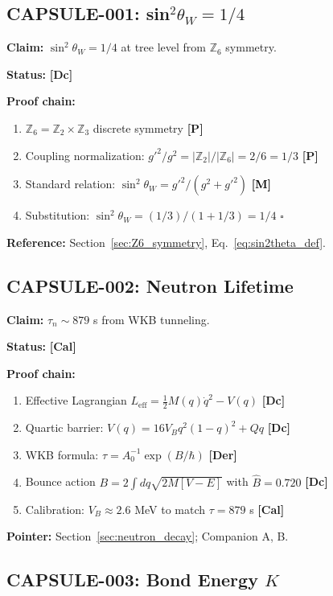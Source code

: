 \documentclass[11pt,a4paper]{article}
\newcommand{\tagP}{\textcolor{red!70!black}{\textbf{[P]}}}
\newcommand{\tagDc}{\textcolor{blue!70!black}{\textbf{[Dc]}}}
\newcommand{\tagDer}{\textcolor{green!50!black}{\textbf{[Der]}}}
\newcommand{\tagCal}{\textcolor{purple!70!black}{\textbf{[Cal]}}}
\newcommand{\tagM}{\textcolor{black}{\textbf{[M]}}}
\begin{document}
\subsection{CAPSULE-001: sin$^2\theta_W = 1/4$}

\textbf{Claim:} $\sin^2\theta_W = 1/4$ at tree level from $\mathbb{Z}_6$ symmetry.

\textbf{Status:} \tagDc{}

\textbf{Proof chain:}
\begin{enumerate}
    \item $\mathbb{Z}_6 = \mathbb{Z}_2 \times \mathbb{Z}_3$ discrete symmetry \tagP{}
    \item Coupling normalization: $g'^2/g^2 = |\mathbb{Z}_2|/|\mathbb{Z}_6| = 2/6 = 1/3$ \tagP{}
    \item Standard relation: $\sin^2\theta_W = g'^2/(g^2+g'^2)$ \tagM{}
    \item Substitution: $\sin^2\theta_W = (1/3)/(1 + 1/3) = 1/4$ \quad $\square$
\end{enumerate}

\textbf{Reference:} Section~\ref{sec:Z6_symmetry}, Eq.~\eqref{eq:sin2theta_def}.

\subsection{CAPSULE-002: Neutron Lifetime}

\textbf{Claim:} $\tau_n \sim 879$ s from WKB tunneling.

\textbf{Status:} \tagCal{}

\textbf{Proof chain:}
\begin{enumerate}
    \item Effective Lagrangian $L_{\text{eff}} = \frac{1}{2}M(q)\dot{q}^2 - V(q)$ \tagDc{}
    \item Quartic barrier: $V(q) = 16V_B q^2(1-q)^2 + Qq$ \tagDc{}
    \item WKB formula: $\tau = A_0^{-1} \exp(B/\hbar)$ \tagDer{}
    \item Bounce action $B = 2\int dq\sqrt{2M[V-E]}$ with $\hat{B} = 0.720$ \tagDc{}
    \item Calibration: $V_B \approx 2.6$ MeV to match $\tau = 879$ s \tagCal{}
\end{enumerate}

\textbf{Pointer:} Section~\ref{sec:neutron_decay}; Companion A, B.

\subsection{CAPSULE-003: Bond Energy $K$}
\end{document}
